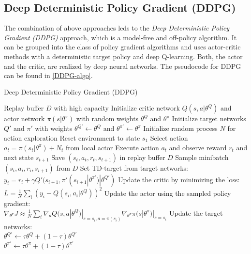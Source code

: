 \subsection{Deep Deterministic Policy Gradient (DDPG)}
\nocite{lillicrap2015continuous}
The combination of above approaches leds to the \textit{Deep Deterministic Policy Gradient (DDPG)} approach, which is a model-free and off-policy algorithm. It can be grouped into the class of policy gradient algorithms and uses actor-critic methods with a deterministic target policy and deep Q-learning. Both, the actor and the critic, are realized by deep neural networks. The pseudocode for DDPG can be found in \ref{DDPG-algo}.
\begin{algorithm}
	\caption{Deep Deterministic Policy Gradient (DDPG)}\label{DDPG-algo}
	\begin{algorithmic}
		\REQUIRE Replay buffer $\mathit{D}$ with high capacity
		\REQUIRE Initialize critic network $Q(s,a|\theta^Q)$ and actor network $\pi(s|\theta^\pi)$ with random weights $\theta^Q$ and $\theta^\pi$
		\REQUIRE Initialize target networks $Q'$ and $\pi'$ with weights $\theta^{Q'}\leftarrow\theta^Q$ and $\theta^{\pi'}\leftarrow\theta^\pi$
		\STATE Initialize random process $\mathit{N}$ for action exploration
		\STATE Reset environment to state $s_1$
		\STATE Select action $a_t = \pi(s_t|\theta^\pi) + \mathit{N}_t$ from local actor
		\STATE Execute action $a_t$ and observe reward $r_t$ and next state $s_{t+1}$
		\STATE Save $(s_t, a_t, r_t,s_{t+1})$ in replay buffer $D$
		\STATE Sample minibatch $(s_i, a_i, r_i,s_{i+1})$ from $D$
		\STATE Set TD-target from target networks:\\
		\qquad $y_i = r_i + \gamma Q'(s_{i+1}, \pi'(s_{i+1}|\theta^{\pi'})|\theta^{Q'})$
		\STATE Update the critic by minimizing the loss:\\
		\qquad $L=\frac{1}{N}\sum_i(y_i - Q(s_i,a_i|\theta^Q))^2$
		\STATE Update the actor using the sampled policy gradient:\\ 			\qquad $\nabla_{\theta^\pi}J \approx \frac{1}{N} \sum_i \nabla_a Q(s,a|\theta^Q)|_{s=s_i, a=\pi(s_i)}\nabla_{\theta^\pi}\pi(s|\theta^\pi)|_{s=s_i}$
		\STATE Update the target networks:\\
		\qquad $\theta^{Q'}\leftarrow \tau \theta^Q + (1-\tau)\theta^{Q'}$\\
		\qquad $\theta^{\pi'}\leftarrow \tau \theta^\pi + (1-\tau)\theta^{\pi'}$
		\ENDFOR
		\ENDFOR
	\end{algorithmic}
\end{algorithm}
